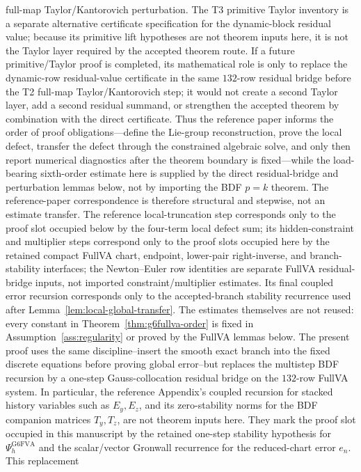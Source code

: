 \documentclass[preprint,12pt]{elsarticle}
\begin{document}
full-map Taylor/Kantorovich perturbation.  The T3 primitive Taylor inventory is
a separate alternative certificate specification for the dynamic-block residual
value; because its primitive lift hypotheses are not theorem inputs here, it
is not the Taylor layer required by the accepted theorem route.
If a future primitive/Taylor proof is completed, its mathematical role is only
to replace the dynamic-row residual-value certificate in the same \(132\)-row
residual bridge before the T2 full-map Taylor/Kantorovich step; it would not
create a second Taylor layer, add a second residual summand, or strengthen the
accepted theorem by combination with the direct certificate.
Thus the reference paper informs the order of proof
obligations---define the Lie-group reconstruction, prove the local defect,
transfer the defect through the constrained algebraic solve, and only then
report numerical diagnostics after the theorem boundary is fixed---while the
load-bearing sixth-order estimate here is supplied by the
direct residual-bridge and perturbation lemmas below, not by importing the
BDF \(p=k\) theorem.
The reference-paper correspondence is therefore structural and stepwise, not
an estimate transfer.  The reference local-truncation step corresponds only
to the proof slot occupied below by the four-term local defect sum; its
hidden-constraint and multiplier steps correspond only to the proof slots
occupied here by the retained compact FullVA chart, endpoint, lower-pair
right-inverse, and branch-stability interfaces; the Newton--Euler row
identities are separate FullVA residual-bridge inputs, not imported
constraint/multiplier estimates. Its final coupled error recursion
corresponds only to the accepted-branch stability recurrence used
after Lemma~\ref{lem:local-global-transfer}.  The estimates themselves are
not reused: every constant in Theorem~\ref{thm:g6fullva-order} is fixed in
Assumption~\ref{ass:regularity} or proved by the FullVA lemmas below.  The
present proof uses the same discipline--insert the smooth
exact branch into the fixed discrete equations before proving global
error--but replaces the multistep BDF recursion by a one-step
Gauss-collocation residual bridge on the \(132\)-row FullVA system.
In particular, the reference Appendix's coupled recursion for stacked
history variables such as \(E_y,E_z\), and its zero-stability norms for
the BDF companion matrices \(T_y,T_z\), are not theorem inputs here.  They
mark the proof slot occupied in this manuscript by the retained one-step
stability hypothesis for \(\Psi_h^{\mathrm{G6FVA}}\) and the scalar/vector
Gronwall recurrence for the reduced-chart error \(e_n\).  This replacement
\end{document}
